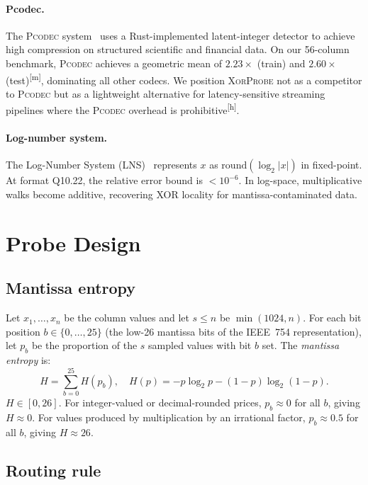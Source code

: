 \documentclass[sigconf]{acmart}
\newcommand{\pcodec}{\textsc{Pcodec}\xspace}
\newcommand{\system}{\textsc{XorProbe}\xspace}
\newcommand{\measured}{\textsuperscript{[m]}\xspace}
\newcommand{\hypothesis}{\textsuperscript{[h]}\xspace}
\begin{document}
\paragraph{Pcodec.}
The \pcodec system~\cite{Pcodec2025} uses a Rust-implemented latent-integer
detector to achieve high compression on structured scientific and financial
data.  On our 56-column benchmark, \pcodec achieves a geometric mean of
$2.23\times$ (train) and $2.60\times$ (test)\measured, dominating all other
codecs.  We position \system not as a competitor to \pcodec but as a
lightweight alternative for latency-sensitive streaming pipelines where the
\pcodec overhead is prohibitive\hypothesis.

\paragraph{Log-number system.}
The Log-Number System (LNS)~\cite{LNS1975} represents $x$ as $\text{round}(\log_2 |x|)$
in fixed-point.  At format Q10.22, the relative error bound is $< 10^{-6}$.
In log-space, multiplicative walks become additive, recovering XOR locality
for mantissa-contaminated data.

\section{Probe Design}
\label{sec:probe}

\subsection{Mantissa entropy}

Let $x_1, \ldots, x_n$ be the column values and let $s \leq n$ be
$\min(1024, n)$.  For each bit position $b \in \{0, \ldots, 25\}$ (the
low-26 mantissa bits of the IEEE~754 representation), let $p_b$ be the
proportion of the $s$ sampled values with bit $b$ set.  The
\emph{mantissa entropy} is:
\[
H = \sum_{b=0}^{25} H(p_b), \quad H(p) = -p\log_2 p - (1-p)\log_2(1-p).
\]
$H \in [0, 26]$.  For integer-valued or decimal-rounded prices,
$p_b \approx 0$ for all $b$, giving $H \approx 0$.  For values produced
by multiplication by an irrational factor, $p_b \approx 0.5$ for all $b$,
giving $H \approx 26$.

\subsection{Routing rule}
\end{document}
